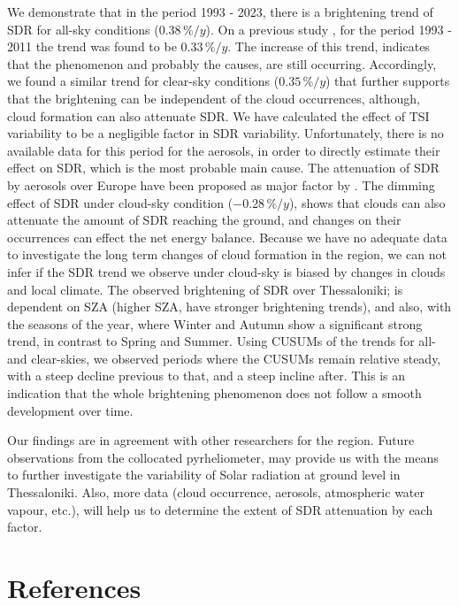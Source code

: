 \documentclass[An awesome
journal,,,moreauthors,pdftex]{Definitions/mdpi}
\begin{document}
We demonstrate that in the period 1993 - 2023, there is a brightening
trend of SDR for all-sky conditions (\(0.38\,\%/y\)). On a previous
study \citep{Bais2013}, for the period 1993 - 2011 the trend was found
to be \(0.33\,\%/y\). The increase of this trend, indicates that the
phenomenon and probably the causes, are still occurring. Accordingly, we
found a similar trend for clear-sky conditions (\(0.35\,\%/y\)) that
further supports that the brightening can be independent of the cloud
occurrences, although, cloud formation can also attenuate SDR. We have
calculated the effect of TSI variability to be a negligible factor in
SDR variability. Unfortunately, there is no available data for this
period for the aerosols, in order to directly estimate their effect on
SDR, which is the most probable main cause. The attenuation of SDR by
aerosols over Europe have been proposed as major factor by
\citet{Wild2021}. The dimming effect of SDR under cloud-sky condition
(\(-0.28\,\%/y\)), shows that clouds can also attenuate the amount of
SDR reaching the ground, and changes on their occurrences can effect the
net energy balance. Because we have no adequate data to investigate the
long term changes of cloud formation in the region, we can not infer if
the SDR trend we observe under cloud-sky is biased by changes in clouds
and local climate. The observed brightening of SDR over Thessaloniki; is
dependent on SZA (higher SZA, have stronger brightening trends), and
also, with the seasons of the year, where Winter and Autumn show a
significant strong trend, in contrast to Spring and Summer. Using CUSUMs
of the trends for all- and clear-skies, we observed periods where the
CUSUMs remain relative steady, with a steep decline previous to that,
and a steep incline after. This is an indication that the whole
brightening phenomenon does not follow a smooth development over time.

Our findings are in agreement with other researchers for the region.
Future observations from the collocated pyrheliometer, may provide us
with the means to further investigate the variability of Solar radiation
at ground level in Thessaloniki. Also, more data (cloud occurrence,
aerosols, atmospheric water vapour, etc.), will help us to determine the
extent of SDR attenuation by each factor.

\hypertarget{references}{%
\section*{References}\label{references}}
\end{document}
